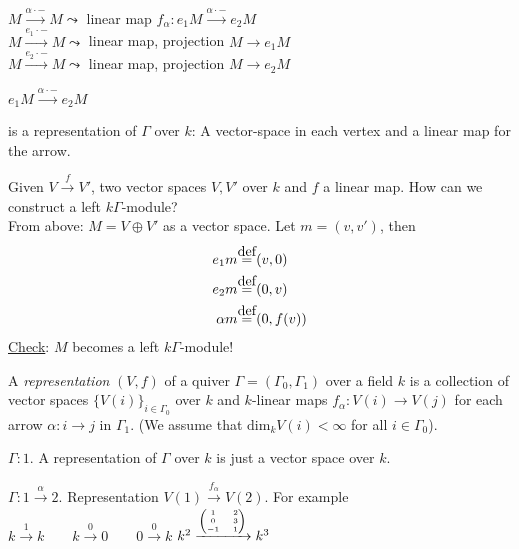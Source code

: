 \begin{exam}
\noindent \(M \xrightarrow{\alpha\cdot-} M \leadsto\) linear map
\(f_\alpha\colon e_1M\xrightarrow{\alpha\cdot-} e_2M\)\\
\(M\xrightarrow{e_1\cdot-}M\leadsto\) linear map, projection \(M\to e_1M\)\\
\(M\xrightarrow{e_2\cdot-}M\leadsto\) linear map, projection \(M\to e_2M\)\\

\begin{center}
\(e_1M \xrightarrow{\alpha\cdot -} e_2M\)
\end{center}
is a representation of \(\Gamma\) over \(k\): A vector-space in each
vertex and a linear map for the arrow.
\end{exam}

Given $V\xrightarrow{f} V'$, two vector spaces $V,V'$ over \(k\) and
\(f\) a linear map. How can we construct a left \(k\Gamma\)-module?\\ 
From above: \(M = V\oplus V'\) as a vector space. Let \(m = (v, v')\), then\\
\begin{align}
e_1m & \defeq (v, 0)\notag\\
e_2m & \defeq (0, v)\notag\\
\alpha m & \defeq (0, f(v))\notag
\end{align}
\underline{Check}: \(M\) becomes a left \(k\Gamma\)-module!
\begin{defin}
  A \emph{representation} \((V, f)\) of a quiver
  \(\Gamma = (\Gamma_0, \Gamma_1)\) over a field \(k\) is a collection
  of vector spaces \(\{V(i)\}_{i\in\Gamma_0}\) over \(k\) and
  \(k\)-linear maps \(f_\alpha\colon V(i)\to  V(j)\) for each arrow
  \(\alpha\colon i\to  j\) in \(\Gamma_1\). (We assume that
  \(\text{dim}_kV(i) < \infty\) for all \(i\in\Gamma_0\)).
\end{defin}
\begin{exam}
 \(\Gamma\colon 1.\) A representation of \(\Gamma\) over \(k\) is just
 a vector space over \(k\).
\end{exam}
\begin{exam}
\(\Gamma\colon 1\xrightarrow{\alpha}2\). Representation \(V(1)\xrightarrow{f_\alpha}V(2)\). For example \\
    \(k\xrightarrow{1}k\quad\quad k\xrightarrow{0}0\quad\quad 0\xrightarrow{0}k\)\quad\quad
    \(k^2\xrightarrow{\tiny\begin{pmatrix} 1 & 2\\ 0 & 3 \\ -1 & 1 \end{pmatrix}}k^3\) \\
\end{exam}
